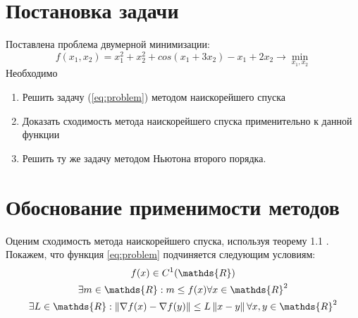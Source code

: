 \documentclass[main.tex]{subfiles}
\begin{document}
	
\section{Постановка задачи}
Поставлена проблема двумерной минимизации:
\begin{equation}\label{eq:problem}
f(x_1, x_2)=x_1^2+x_2^2+cos(x_1+3x_2)-x_1+2x_2 \rightarrow \min_{x_1, x_2}
\end{equation}
Необходимо
\begin{enumerate}
	\item Решить задачу (\ref{eq:problem}) методом наискорейшего спуска
	\item Доказать сходимость метода наискорейшего спуска применительно к данной функции
	\item Решить ту же задачу методом Ньютона второго порядка.
\end{enumerate}

\section{Обоснование применимости методов}
Оценим сходимость метода наискорейшего спуска, используя теорему 1.1 \cite{boldirev}. Покажем, что функция \ref{eq:problem} подчиняется следующим условиям:\\
\begin{gather} %
\label{eq:convex} 
f(x) \in C^1(\mathds{R})\\
\label{eq:bounded}
\exists m \in \mathds{R}: m \le f(x) \forall x \in \mathds{R}^2 \\
\label{eq:lipshitz}
\exists L \in \mathds{R}: \norm{\nabla f(x) - \nabla f(y)} \le L\norm{x-y} \forall x,y \in \mathds{R}^2
\end{gather}
\end{document}

